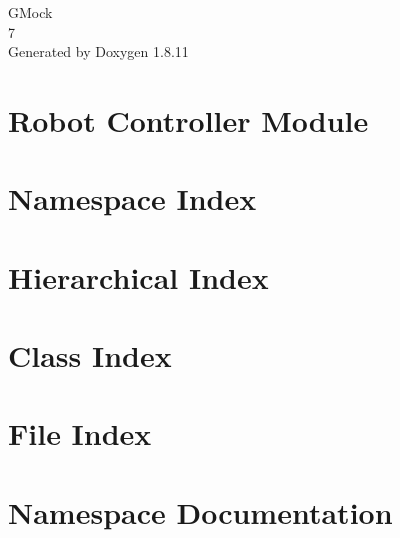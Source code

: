 \documentclass[twoside]{book}
\newcommand{\+}{\discretionary{\mbox{\scriptsize$\hookleftarrow$}}{}{}}
\newcommand{\clearemptydoublepage}{%
  \newpage{\pagestyle{empty}\cleardoublepage}%
}
\begin{document}
\hypersetup{pageanchor=false,
             bookmarksnumbered=true,
             pdfencoding=unicode
            }
\begin{titlepage}
\vspace*{7cm}
\begin{center}%
{\Large G\+Mock \\[1ex]\large 7 }\\
\vspace*{1cm}
{\large Generated by Doxygen 1.8.11}\\
\end{center}
\end{titlepage}
\clearemptydoublepage
\tableofcontents
\clearemptydoublepage
{}
\hypersetup{pageanchor=true}

\chapter{Robot Controller Module}
\label{md_README}
\hypertarget{md_README}{}

\chapter{Namespace Index}

\chapter{Hierarchical Index}

\chapter{Class Index}

\chapter{File Index}

\chapter{Namespace Documentation}

\end{document}
